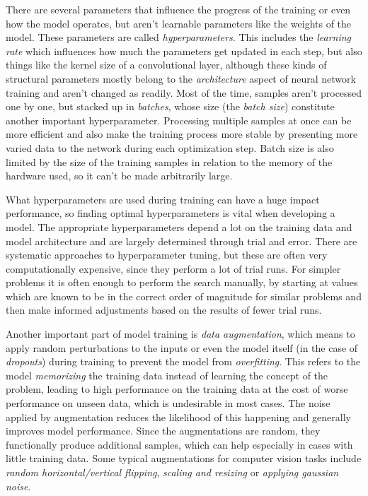 There are several parameters that influence the progress of the training or even how the model operates, but aren't learnable parameters like the weights of the model. These parameters are called \emph{hyperparameters}. This includes the \emph{learning rate} which influences how much the parameters get updated in each step, but also things like the kernel size of a convolutional layer, although these kinds of structural parameters mostly belong to the \emph{architecture} aspect of neural network training and aren't changed as readily. Most of the time, samples aren't processed one by one, but stacked up in \emph{batches}, whose size (the \emph{batch size}) constitute another important hyperparameter. Processing multiple samples at once can be more efficient and also make the training process more stable by presenting more varied data to the network during each optimization step. Batch size is also limited by the size of the training samples in relation to the memory of the hardware used, so it can't be made arbitrarily large. 

What hyperparameters are used during training can have a huge impact performance, so finding optimal hyperparameters is vital when developing a model. The appropriate hyperparameters depend a lot on the training data and model architecture and are largely determined through trial and error. There are systematic approaches to hyperparameter tuning, but these are often very computationally expensive, since they perform a lot of trial runs. For simpler problems it is often enough to perform the search manually, by starting at values which are known to be in the correct order of magnitude for similar problems and then make informed adjustments based on the results of fewer trial runs. 

Another important part of model training is \emph{data augmentation}, which means to apply random perturbations to the inputs or even the model itself (in the case of \emph{dropouts}) during training to prevent the model from \emph{overfitting}. This refers to the model \emph{memorizing} the training data instead of learning the concept of the problem, leading to high performance on the training data at the cost of worse performance on unseen data, which is undesirable in most cases. The noise applied by augmentation reduces the likelihood of this happening and generally improves model performance. Since the augmentations are random, they functionally produce additional samples, which can help especially in cases with little training data. Some typical augmentations for computer vision tasks include \emph{random horizontal/vertical flipping}, \emph{scaling and resizing} or \emph{applying gaussian noise}. 
